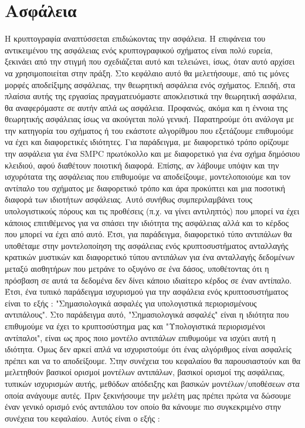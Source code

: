 \chapter{Ασφάλεια}
\label{chapter:security}

Η κρυπτογραφία αναπτύσσεται επιδιώκοντας την ασφάλεια. Η επιφάνεια του αντικειμένου της ασφάλειας ενός κρυπτογραφικού σχήματος είναι πολύ ευρεία, ξεκινάει από την στιγμή που σχεδιάζεται αυτό και τελειώνει, ίσως, όταν αυτό αρχίσει να χρησιμοποιείται στην πράξη. Στο κεφάλαιο αυτό θα μελετήσουμε, από τις μόνες μορφές αποδείξιμης  ασφάλειας, την θεωρητική ασφάλεια ενός σχήματος. Επειδή, στα πλαίσια αυτής της εργασίας πραγματευόμαστε αποκλειστικά την θεωρητική ασφάλεια, θα αναφερόμαστε σε αυτήν απλά ως ασφάλεια. Προφανώς, ακόμα και η έννοια της θεωρητικής ασφάλειας ίσως να ακούγεται πολύ γενική. Παρατηρούμε ότι ανάλογα με την κατηγορία του σχήματος ή του εκάστοτε αλγορίθμου που εξετάζουμε επιθυμούμε να έχει και διαφορετικές ιδιότητες. Για παράδειγμα, με  διαφορετικό τρόπο ορίζουμε την ασφάλεια για ένα SMPC πρωτόκολλο και με διαφορετικό για ένα σχήμα δημόσιου κλειδιού, αφού διαθέτουν ποιοτική διαφορά. Επίσης, αν λάβουμε υπόψιν και την ισχυρότατα της ασφάλειας που επιθυμούμε να αποδείξουμε, μοντελοποιούμε και τον αντίπαλο του σχήματος με διαφορετικό τρόπο και άρα προκύπτει και μια ποσοτική διαφορά των ιδιοτήτων ασφάλειας. Αυτό συνήθως συμπεριλαμβάνει τους υπολογιστικούς πόρους και τις προθέσεις (π.χ. να γίνει αντιληπτός) που μπορεί να έχει κάποιος επιτιθέμενος για να σπάσει την ιδιότητα της ασφάλειας αλλά και το κέρδος που μπορεί να έχει από αυτό. Έτσι, για παράδειγμα, διαφορετικό τύπο αντιπάλων θα υποθέταμε στην μοντελοποίηση της ασφάλειας ενός κρυπτοσυστήματος ανταλλαγής κρατικών μυστικών και διαφορετικό τύπου αντιπάλων για ένα ανταλλαγής δεδομένων μεταξύ αισθητήρων που μετράνε το οξυγόνο σε ένα δάσος, υποθέτοντας ότι η πρόσβαση σε αυτά τα δεδομένα δεν δίνει κάποιο ιδιαίτερο κέρδος σε έναν αντίπαλο. Έτσι, ένα τυπικό παράδειγμα ισχυρισμού για την ασφάλεια ενός κρυπτοσυστήματος είναι το εξής :
"Σημασιολογικά ασφαλές για υπολογιστικά περιορισμένους αντιπάλους". Στο παράδειγμα αυτό, "Σημασιολογικά ασφαλές" είναι η ιδιότητα που επιθυμούμε να έχει το κρυπτοσύστημα μας και "Υπολογιστικά περιορισμένοι αντίπαλοι", είναι ως προς ποιο μοντέλο αντιπάλων επιθυμούμε να ισχύει αυτή η ιδιότητα. Όμως δεν αρκεί απλά να ισχυριστούμε ότι ένας αλγόριθμος είναι ασφαλείς πρέπει και να το αποδείξουμε. Στην συνέχεια του κεφαλαίου θα παρουσιαστούν και θα μελετηθούν βασικοί ορισμοί μοντέλων αντιπάλων, βασικοί ορισμοί της ασφάλειας, τυπικών ισχυρισμών αυτής, μεθόδων απόδειξης και βασικών μοντέλων/υποθέσεων στα οποία ανάγουμε αυτές. Πριν ξεκινήσουμε την μελέτη μας πρέπει πρώτα να δώσουμε έναν γενικό ορισμό ενός αντιπάλου τον οποίο θα κάνουμε πιο συγκεκριμένο στην συνέχεια του κεφαλαίου. Αυτός είναι ο εξής :

